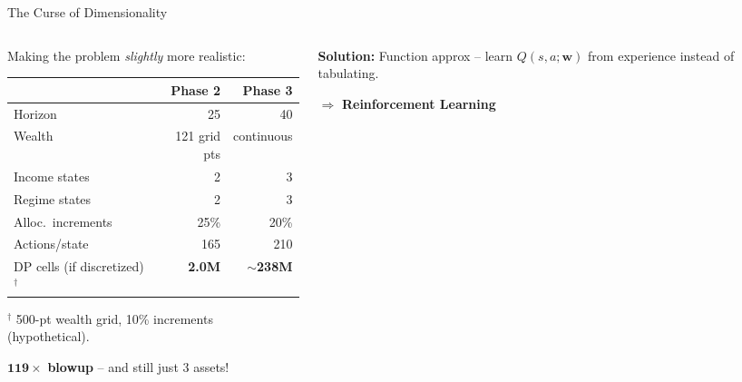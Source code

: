 \documentclass[aspectratio=169, 11pt]{beamer}
\begin{document}
\begin{frame}{The Curse of Dimensionality}
\begin{columns}[T]
\begin{column}{0.52\textwidth}
Making the problem \textit{slightly} more realistic:

\vspace{0.5em}
\begin{tabular}{lrr}
\toprule
& \textbf{Phase 2} & \textbf{Phase 3} \\
\midrule
Horizon          & 25      & 40 \\
Wealth           & 121 grid pts & continuous \\
Income states    & 2       & 3 \\
Regime states    & 2       & 3 \\
Alloc.\ increments & 25\%  & 20\% \\
Actions/state    & 165     & 210 \\
\midrule
DP cells (if discretized)$^\dagger$ & \textbf{2.0M}  & \textbf{$\sim$238M} \\
\bottomrule
\end{tabular}

\vspace{0.2em}
{\scriptsize $^\dagger$ 500-pt wealth grid, 10\% increments (hypothetical).}

\vspace{0.2em}
$\mathbf{119\times}$ \textbf{blowup} -- and still just 3 assets!
\end{column}
\begin{column}{0.44\textwidth}
\centering
{}

\vspace{0.4em}
\textbf{Solution:} Function approx -- learn $Q(s,a;\mathbf{w})$ from experience instead of tabulating.

$\Rightarrow$ \textbf{Reinforcement Learning}
\end{column}
\end{columns}
\end{frame}
\end{document}
